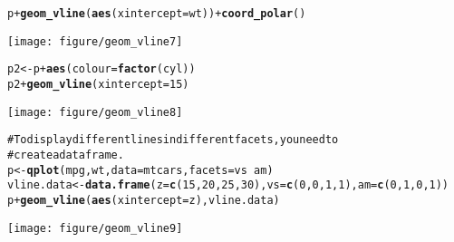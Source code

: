 \documentclass[a4paper,titlepage]{tufte-handout}\usepackage{graphicx, color}
\makeatletter
\def\maxwidth{ %
  \ifdim\Gin@nat@width>\linewidth
    \linewidth
  \else
    \Gin@nat@width
  \fi
}
\newcommand{\hlfunctioncall}[1]{\textcolor[rgb]{0.501960784313725,0,0.329411764705882}{\textbf{#1}}}%
\newcommand{\hlcomment}[1]{\textcolor[rgb]{0.180392156862745,0.6,0.341176470588235}{#1}}%
\newenvironment{kframe}{%
 \def\at@end@of@kframe{}%
 \ifinner\ifhmode%
  \def\at@end@of@kframe{\end{minipage}}%
  \begin{minipage}{\columnwidth}%
 \fi\fi%
 \def\FrameCommand##1{\hskip\@totalleftmargin \hskip-\fboxsep
 \colorbox{shadecolor}{##1}\hskip-\fboxsep
     \hskip-\linewidth \hskip-\@totalleftmargin \hskip\columnwidth}%
 \MakeFramed {\advance\hsize-\width
   \@totalleftmargin\z@ \linewidth\hsize
   \@setminipage}}%
 {\par\unskip\endMakeFramed%
 \at@end@of@kframe}
\newenvironment{knitrout}{}{} %
\makeatother
\begin{document}
\begin{knitrout}
\begin{kframe}
\begin{alltt}
p + \hlfunctioncall{geom_vline}(\hlfunctioncall{aes}(xintercept = wt)) + \hlfunctioncall{coord_polar}()
\end{alltt}
\end{kframe}\texttt{[image: figure/geom\_vline7]} \begin{kframe}\begin{alltt}
p2 <- p + \hlfunctioncall{aes}(colour = \hlfunctioncall{factor}(cyl))
p2 + \hlfunctioncall{geom_vline}(xintercept = 15)
\end{alltt}
\end{kframe}\texttt{[image: figure/geom\_vline8]} \begin{kframe}\begin{alltt}
\hlcomment{# To display different lines in different facets, you need to}
\hlcomment{# create a data frame.}
p <- \hlfunctioncall{qplot}(mpg, wt, data=mtcars, facets = vs ~ am)
vline.data <- \hlfunctioncall{data.frame}(z = \hlfunctioncall{c}(15, 20, 25, 30), vs = \hlfunctioncall{c}(0, 0, 1, 1), am = \hlfunctioncall{c}(0, 1, 0, 1))
p + \hlfunctioncall{geom_vline}(\hlfunctioncall{aes}(xintercept = z), vline.data)
\end{alltt}
\end{kframe}\texttt{[image: figure/geom\_vline9]} 
\end{knitrout}
\end{document}
